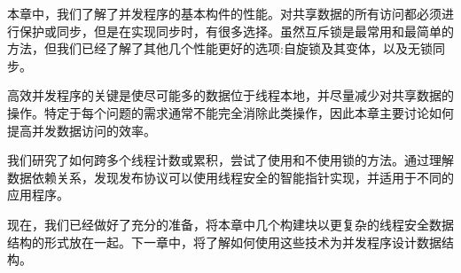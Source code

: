 本章中，我们了解了并发程序的基本构件的性能。对共享数据的所有访问都必须进行保护或同步，但是在实现同步时，有很多选择。虽然互斥锁是最常用和最简单的方法，但我们已经了解了其他几个性能更好的选项:自旋锁及其变体，以及无锁同步。

高效并发程序的关键是使尽可能多的数据位于线程本地，并尽量减少对共享数据的操作。特定于每个问题的需求通常不能完全消除此类操作，因此本章主要讨论如何提高并发数据访问的效率。

我们研究了如何跨多个线程计数或累积，尝试了使用和不使用锁的方法。通过理解数据依赖关系，发现发布协议可以使用线程安全的智能指针实现，并适用于不同的应用程序。

现在，我们已经做好了充分的准备，将本章中几个构建块以更复杂的线程安全数据结构的形式放在一起。下一章中，将了解如何使用这些技术为并发程序设计数据结构。